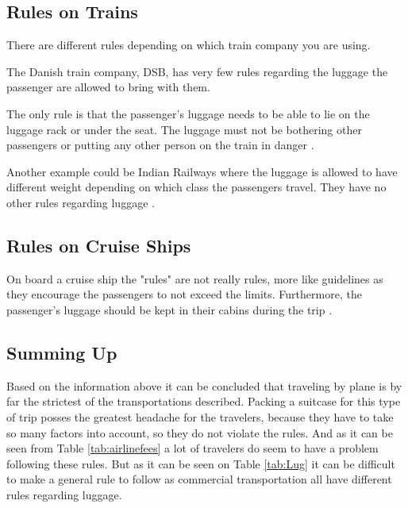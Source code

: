 \subsection{Rules on Trains}

There are different rules depending on which train company you are using. 

The Danish train company, DSB, has very few rules regarding the luggage the passenger are allowed to bring with them. 


The only rule is that the passenger's luggage needs to be able to lie on the luggage rack or under the seat. The luggage must not be bothering other passengers or putting any other person on the train in danger \citep{rulestrain}.


Another example could be Indian Railways where the luggage is allowed to have different weight depending on which class the passengers travel. They have no other rules regarding luggage \citep{idianrules}.

\subsection{Rules on Cruise Ships}
On board a cruise ship the "rules" are not really rules, more like guidelines as they encourage the passengers to not exceed the limits. Furthermore, the passenger's luggage should be kept in their cabins during the trip \citep{Cruise}.

\subsection{Summing Up}
Based on the information above it can be concluded that traveling by plane is by far the strictest of the transportations described. Packing a suitcase for this type of trip posses the greatest headache for the travelers, because they have to take so many factors into account, so they do not violate the rules. And as it can be seen from Table \ref{tab:airlinefees} a lot of travelers do seem to have a problem following these rules. But as it can be seen on Table \ref{tab:Lug} it can be difficult to make a general rule to follow as commercial transportation all have different rules regarding luggage.